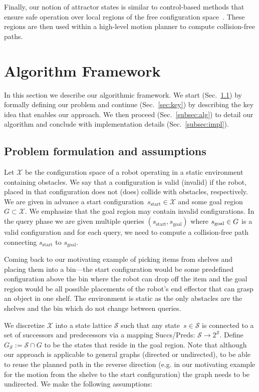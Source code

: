 \documentclass[letterpaper]{article} %
\newcommand{\calX}{\ensuremath{\mathcal{X}}\xspace}
\newcommand{\calS}{\ensuremath{\mathcal{S}}\xspace}
\newcommand{\sStart}{\ensuremath{s_{\text{start}}\xspace}}
\begin{document}
Finally, our notion of attractor states is similar to control-based methods that  ensure safe operation over local regions of the free configuration space~\cite{CRC03,CCR06}.
These regions are then used within a high-level motion planner to compute collision-free paths.

\section{Algorithm Framework}
\label{sec:alg}
In this section we describe our algorithmic framework. We start (Sec.~\ref{sec:pdef}) by formally defining our problem and continue (Sec.~\ref{sec:key}) by describing the key idea that enables our approach.
We then proceed (Sec.~\ref{subsec:alg}) to detail our algorithm and conclude with implementation details (Sec.~\ref{subsec:impl}).

\subsection{Problem formulation and assumptions}
\label{sec:pdef}
Let $\calX$ be the configuration space of a robot operating in a static environment containing obstacles.
We say that a configuration is valid (invalid) if the robot, placed in that configuration does not (does) collide with obstacles, respectively.
We are given in advance a start configuration~$\sStart \in \calX$ and some goal region~$G \subset \calX$.
We emphasize that the goal region may contain invalid configurations.
In the query phase we are given multiple queries $(\sStart, s_{\text{goal}})$ where $s_{\rm goal} \in G$ is a valid configuration and for each query, we need to compute a collision-free path connecting $\sStart$ to $s_{\text{goal}}$.

Coming back to our motivating example of picking items from  shelves and placing them into a bin---the start configuration would be some predefined configuration above the bin where the robot can drop off the item and the goal region would be all possible placements of the robot's end effector that can grasp an object in one shelf. The environment is static as the only abstacles are the shelves and the bin which do not change between queries.

We discretize $\calX$ into a state lattice $\calS$ such that any state~$s \in \calS$ is connected to a set of successors and predecessors via a mapping Succs/Preds: $\calS \rightarrow 2^\calS$.
Define $G_\calS := \calS \cap G$ to be the states that reside in the goal region. Note that although our approach is applicable to general graphs (directed or undirected), to be able to reuse the planned path in the reverse direction (e.g. in our motivating example for the motion from the shelve to the start configuration) the graph needs to be undirected.
We make the following assumptions:
\end{document}
